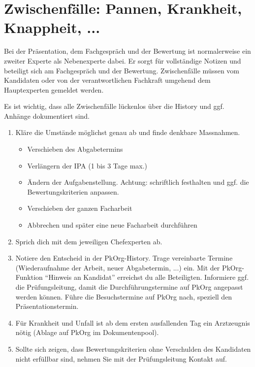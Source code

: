 \section{Zwischenfälle: Pannen, Krankheit, Knappheit, ...}
Bei der Präsentation, dem Fachgespräch und der Bewertung ist normalerweise ein zweiter Experte als Nebenexperte dabei. Er sorgt für vollständige Notizen und beteiligt sich am Fachgespräch und der Bewertung. Zwischenfälle müssen vom Kandidaten oder von der verantwortlichen Fachkraft umgehend dem Hauptexperten gemeldet werden.

Es ist wichtig, dass alle Zwischenfälle lückenlos über die History und ggf. Anhänge dokumentiert sind.

\begin{enumerate}
  \item Kläre die Umstände möglichst genau ab und finde denkbare Massnahmen.
  \begin{itemize}
    \item Verschieben des Abgabetermins
    \item Verlängern der IPA (1 bis 3 Tage max.)
    \item Ändern der Aufgabenstellung. Achtung: schriftlich festhalten und ggf. die Bewertungskriterien anpassen.
    \item Verschieben der ganzen Facharbeit
    \item Abbrechen und später eine neue Facharbeit durchführen
  \end{itemize}
  \item Sprich dich mit dem jeweiligen Chefexperten ab.
  \item Notiere den Entscheid in der PkOrg-History. Trage vereinbarte Termine (Wiederaufnahme der Arbeit, neuer Abgabetermin, ...) ein. Mit der PkOrg-Funktion \enquote{Hinweis an Kandidat} erreichst du alle Beteiligten.
  Informiere ggf. die Prüfungsleitung, damit die Durchführungstermine auf PkOrg
  angepasst werden können. Führe die Besuchstermine auf PkOrg nach, speziell den Präsentationstermin.
  \item Für Krankheit und Unfall ist ab dem ersten ausfallenden Tag ein Arztzeugnis nötig (Ablage auf PkOrg im Dokumentenpool).
  \item Sollte sich zeigen, dass Bewertungskriterien ohne Verschulden des Kandidaten nicht erfüllbar sind, nehmen Sie mit der Prüfungsleitung Kontakt auf.
\end{enumerate}

